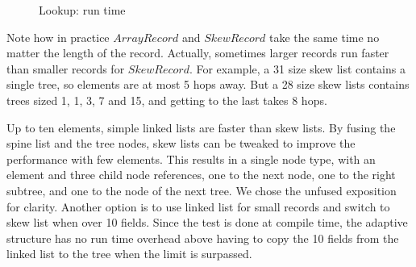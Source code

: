 \documentclass[natbib]{sigplanconf}
\newcommand{\Conid}[1]{\mathit{#1}}
\begin{document}
\begin{figure}[b]
\begin{center}
\end{center}
\caption{Lookup: run time}
\label{run_time}
\end{figure}

Note how in practice \ensuremath{\Conid{ArrayRecord}} and \ensuremath{\Conid{SkewRecord}} take the same time no matter the length of the record.
Actually, sometimes larger records run faster than smaller records for \ensuremath{\Conid{SkewRecord}}.
For example, a 31 size skew list contains a single tree,
so elements are at most 5 hops away.
But a 28 size skew lists contains trees sized
1, 1, 3, 7 and 15,
and getting to the last takes 8 hops.

Up to ten elements, simple linked lists are faster than skew lists.
By fusing the spine list and the tree nodes,
skew lists can be tweaked to improve the performance with few elements.
This results in a single node type,
with an element and three child node references,
one to the next node,
one to the right subtree,
and one to the node of the next tree.
We chose the unfused exposition for clarity.
Another option is to use linked list for small records and switch to
skew list when over 10 fields.
Since the test is done at compile time, the adaptive structure has no
run time overhead
above having to copy the 10 fields from the linked list to the tree
when the limit is surpassed.
\end{document}
